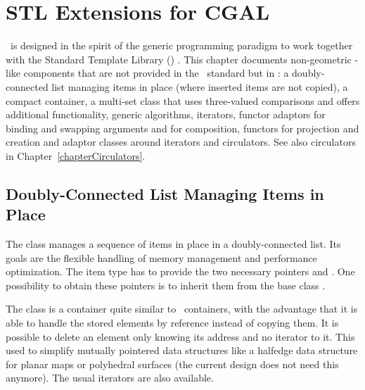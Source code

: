 
\chapter{STL Extensions for CGAL}



\cgal\ is designed in the spirit of the generic programming paradigm
to work together with the Standard Template Library (\stl)
\cite{cgal:ansi-is14882-98,cgal:a-gps-98}. This chapter documents non-geometric
\stl-like components that are not provided in the \stl\ standard but
in \cgal: a doubly-connected list managing items in place (where
inserted items are not copied), a compact container, a multi-set class that
uses three-valued comparisons and offers additional functionality,
generic algorithms, iterators, functor adaptors for binding and swapping
arguments and for composition, functors for projection and creation and
adaptor classes around iterators and circulators. See also circulators in
Chapter~\ref{chapterCirculators}.

\section{Doubly-Connected List Managing Items in Place}

The class  manages a
sequence of items in place in a doubly-connected list. Its goals are
the flexible handling of memory management and performance
optimization. The item type has to provide the two necessary
pointers  and . One possibility
to obtain these pointers is to inherit them from the base class
.

The class  is a container quite similar
to \stl\ containers, with the advantage that it is able to handle the
stored elements by reference instead of copying them. It is possible
to delete an element only knowing its address and no iterator to it.
This used to simplify mutually pointered data structures like a halfedge
data structure for planar maps or polyhedral surfaces (the current design
does not need this anymore). The usual iterators are also available.


